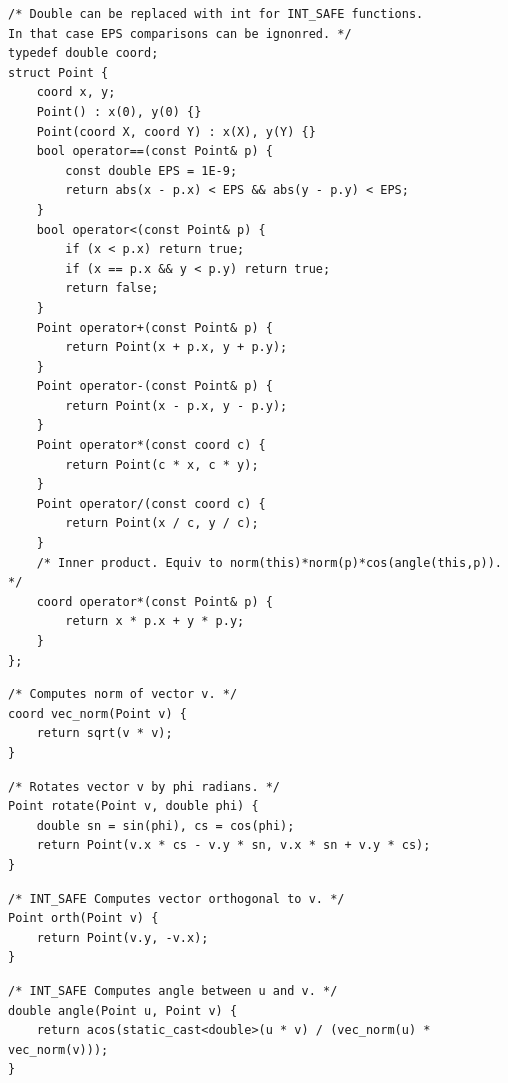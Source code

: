 \documentclass[a4paper,10pt]{article}
\newenvironment{keepfunction}{\begin{samepage}}{\end{samepage}}
\begin{document}
\begin{keepfunction}
\begin{verbatim}
/* Double can be replaced with int for INT_SAFE functions.
In that case EPS comparisons can be ignonred. */
typedef double coord;
struct Point {
    coord x, y;
    Point() : x(0), y(0) {}
    Point(coord X, coord Y) : x(X), y(Y) {}
    bool operator==(const Point& p) {
        const double EPS = 1E-9;
        return abs(x - p.x) < EPS && abs(y - p.y) < EPS;
    }
    bool operator<(const Point& p) {
        if (x < p.x) return true;
        if (x == p.x && y < p.y) return true;
        return false;
    }
    Point operator+(const Point& p) {
        return Point(x + p.x, y + p.y);
    }
    Point operator-(const Point& p) {
        return Point(x - p.x, y - p.y);
    }
    Point operator*(const coord c) {
        return Point(c * x, c * y);
    }
    Point operator/(const coord c) {
        return Point(x / c, y / c);
    }
    /* Inner product. Equiv to norm(this)*norm(p)*cos(angle(this,p)). */
    coord operator*(const Point& p) {
        return x * p.x + y * p.y;
    }
};
\end{verbatim}
\end{keepfunction}

\begin{keepfunction}
\begin{verbatim}
/* Computes norm of vector v. */
coord vec_norm(Point v) {
    return sqrt(v * v);
}
\end{verbatim}
\end{keepfunction}

\begin{keepfunction}
\begin{verbatim}
/* Rotates vector v by phi radians. */
Point rotate(Point v, double phi) {
    double sn = sin(phi), cs = cos(phi);
    return Point(v.x * cs - v.y * sn, v.x * sn + v.y * cs);
}
\end{verbatim}
\end{keepfunction}

\begin{keepfunction}
\begin{verbatim}
/* INT_SAFE Computes vector orthogonal to v. */
Point orth(Point v) {
    return Point(v.y, -v.x);
}
\end{verbatim}
\end{keepfunction}

\begin{keepfunction}
\begin{verbatim}
/* INT_SAFE Computes angle between u and v. */
double angle(Point u, Point v) {
    return acos(static_cast<double>(u * v) / (vec_norm(u) * vec_norm(v)));
}
\end{verbatim}
\end{keepfunction}
\end{document}
